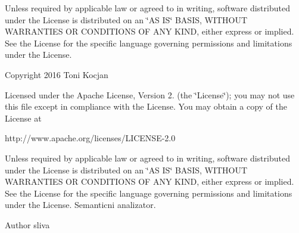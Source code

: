 Unless required by applicable law or agreed to in writing, software distributed under the License is distributed on an \char`\"{}\+A\+S I\+S\char`\"{} B\+A\+S\+IS, W\+I\+T\+H\+O\+UT W\+A\+R\+R\+A\+N\+T\+I\+ES OR C\+O\+N\+D\+I\+T\+I\+O\+NS OF A\+NY K\+I\+ND, either express or implied. See the License for the specific language governing permissions and limitations under the License.

Copyright 2016 Toni Kocjan

Licensed under the Apache License, Version 2. (the \char`\"{}\+License\char`\"{}); you may not use this file except in compliance with the License. You may obtain a copy of the License at \begin{DoxyVerb}http://www.apache.org/licenses/LICENSE-2.0
\end{DoxyVerb}


Unless required by applicable law or agreed to in writing, software distributed under the License is distributed on an \char`\"{}\+A\+S I\+S\char`\"{} B\+A\+S\+IS, W\+I\+T\+H\+O\+UT W\+A\+R\+R\+A\+N\+T\+I\+ES OR C\+O\+N\+D\+I\+T\+I\+O\+NS OF A\+NY K\+I\+ND, either express or implied. See the License for the specific language governing permissions and limitations under the License. Semanticni analizator.

\begin{DoxyAuthor}{Author}
sliva 
\end{DoxyAuthor}
